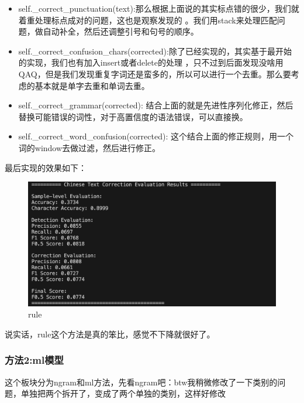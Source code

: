 \documentclass[answers]{exam}  %
\begin{document}
\begin{itemize}
    \item self.\_correct\_punctuation(text):那么根据上面说的其实标点错的很少，我们就着重处理标点成对的问题，这也是观察发现的
    。我们用stack来处理匹配问题，做自动补全，然后还调整引号和句号的顺序。
    \item self.\_correct\_confusion\_chars(corrected):除了已经实现的，其实基于最开始的实现，我们也有加入insert或者delete的处理
    ，只不过到后面发现没啥用QAQ，但是我们发现重复字词还是蛮多的，所以可以进行一个去重。那么要考虑的基本就是单字去重和单词去重。
    \item self.\_correct\_grammar(corrected): 结合上面的就是先进性序列化修正，然后替换可能错误的词性，对于高置信度的语法错误，可以直接换。
    \item self.\_correct\_word\_confusion(corrected): 这个结合上面的修正规则，用一个词的window去做过滤，然后进行修正。
\end{itemize}
最后实现的效果如下：\\
\begin{figure}[h]
    \centering
    \label{rule}
    \includegraphics[width=1\textwidth]{../pic/rule.png} 
    \caption{rule}  
\end{figure}

说实话，rule这个方法是真的笨比，感觉不下降就很好了。

\subsubsection{方法2:ml模型}
这个板块分为ngram和ml方法，先看ngram吧：btw我稍微修改了一下类别的问题，单独把两个拆开了，变成了两个单独的类别，这样好修改\\
\medskip
\end{document}
